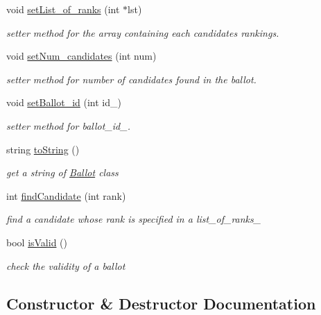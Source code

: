 \begin{DoxyCompactItemize}
void \hyperlink{classBallot_a3cff40fe3958d94689df4a92b178bb2a}{set\+List\+\_\+of\+\_\+ranks} (int $\ast$lst)
\begin{DoxyCompactList}\small\item\em setter method for the array containing each candidate\textquotesingle{}s rankings. \end{DoxyCompactList}\item 
void \hyperlink{classBallot_a430f542fc81f87df6ec43a33b364c164}{set\+Num\+\_\+candidates} (int num)
\begin{DoxyCompactList}\small\item\em setter method for number of candidates found in the ballot. \end{DoxyCompactList}\item 
void \hyperlink{classBallot_a4ee7baa84508cfd6551fb8d6974955d6}{set\+Ballot\+\_\+id} (int id\+\_\+)
\begin{DoxyCompactList}\small\item\em setter method for ballot\+\_\+id\+\_\+. \end{DoxyCompactList}\item 
string \hyperlink{classBallot_aec0bd052daf317281fd0989af273bbcc}{to\+String} ()
\begin{DoxyCompactList}\small\item\em get a string of \hyperlink{classBallot}{Ballot} class \end{DoxyCompactList}\item 
int \hyperlink{classBallot_aa18a30fb20e83449878f587e66c27960}{find\+Candidate} (int rank)
\begin{DoxyCompactList}\small\item\em find a candidate whose rank is specified in a list\+\_\+of\+\_\+ranks\+\_\+ \end{DoxyCompactList}\item 
bool \hyperlink{classBallot_a2fecab45faac9e47e6c855a3bb227c58}{is\+Valid} ()
\begin{DoxyCompactList}\small\item\em check the validity of a ballot \end{DoxyCompactList}\end{DoxyCompactItemize}


\subsection{Constructor \& Destructor Documentation}
